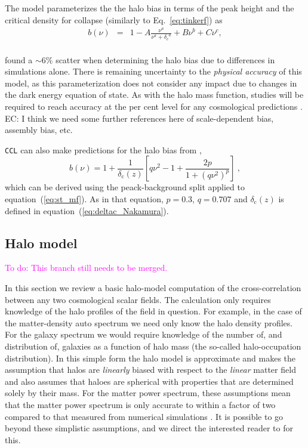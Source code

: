\documentclass[\docopts]{\docclass}
\newcommand{\todo}[1]{\textcolor{magenta}{To do: #1}}
\newcommand{\elisa}[1]{\textcolor{green!10!orange!90!}{EC: #1}}
\newcommand{\ccl}{{\tt CCL}\xspace}
\begin{document}
The \citet{Tinker2010} model parameterizes the the halo bias in terms of the peak height and the critical density for collapse (similarly to Eq.~\ref{eq:tinkerf}) as
\begin{eqnarray}
  b(\nu) &=& 1 - A\frac{\nu^a}{\nu^a + {\delta_c}^a} + B\nu^b+C\nu^c,\\
\end{eqnarray}

\citet{Tinker2010} found a $\sim6\%$ scatter when determining the halo bias due to differences in simulations alone. There is remaining uncertainty to the {\em physical accuracy} of this model, as this parameterization does not consider any impact due to changes in the dark energy equation of state. As with the halo mass function, studies will be required to reach accuracy at the per cent level for any cosmological predictions \cite[e.g.]{Gao2005, Schulz2006, Smith2007, Croton2007, Parfrey2011, Sunayama2016, Villarreal2017, Mao2018}. \elisa{I think we need some further references here of scale-dependent bias, assembly bias, etc.}

\ccl can also make predictions for the halo bias from \cite{Sheth1999},
\begin{equation}
b(\nu)=1+\frac{1}{\delta_\mathrm{c}(z)}\left[q\nu^2-1+\frac{2p}{1+(q\nu^2)^p}\right]\ ,
\label{eq:st_bias}
\end{equation}
which can be derived using the peack-background split applied to equation~(\ref{eq:st_mf}). As in that equation, $p=0.3$, $q=0.707$ and $\delta_\mathrm{c}(z)$ is defined in equation~(\ref{eq:deltac_Nakamura}).


\subsection{Halo model}
\label{sec:halo_model}
\todo{This branch still needs to be merged.}

In this section we review a basic halo-model computation \citep{Seljak2000,Peacock2000,Cooray2002} of the cross-correlation between any two cosmological scalar fields. The calculation only requires knowledge of the halo profiles of the field in question. For example, in the case of the matter-density auto spectrum we need only know the halo density profiles. For the galaxy spectrum we would require knowledge of the number of, and distribution of, galaxies as a function of halo mass (the so-called halo-occupation distribution). In this simple form the halo model is approximate and makes the assumption that halos are \emph{linearly} biased with respect to the \emph{linear} matter field and also assumes that haloes are spherical with properties that are determined solely by their mass. For the matter power spectrum, these assumptions mean that the matter power spectrum is only accurate to within a factor of two compared to that measured from numerical simulations \citep{Mead2015}. It is possible to go beyond these simplistic assumptions, and we direct the interested reader to \cite{Cooray2002,Smith2007,Giocoli2010,Smith2011} for this.
\end{document}
